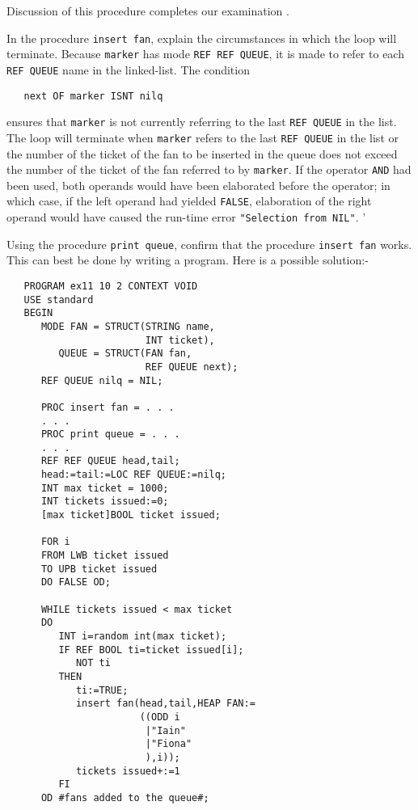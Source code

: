 Discussion of this procedure completes our examination
 .
\begin{exercise}
\item In the procedure \verb|insert fan|, explain the circumstances
in which the loop will terminate. \ans Because \verb|marker| has mode
\verb|REF REF QUEUE|, it is made to refer to each \verb|REF QUEUE|
name in the linked-list. The condition
\begin{verbatim}
   next OF marker ISNT nilq
\end{verbatim}
\noindent
ensures that \verb|marker| is not currently referring to the last
\verb|REF QUEUE| in the list. The loop will terminate when
\verb|marker| refers to the last \verb|REF QUEUE| in the list or the
number of the ticket of the fan to be inserted in the queue does not
exceed the number of the ticket of the fan referred to by
\verb|marker|.
\medskip
If the operator \verb|AND| had been used, both operands would have been
elaborated before the operator; in which case, if the left operand
had yielded \verb|FALSE|, elaboration of the right operand would have
caused the run-time error \verb|"Selection from NIL"|.
'
\item Using the procedure \verb|print queue|, confirm that the
procedure \verb|insert fan| works. \ans This can best be done by
writing a program. Here is a possible solution:-
\begin{verbatim}
   PROGRAM ex11 10 2 CONTEXT VOID
   USE standard
   BEGIN
      MODE FAN = STRUCT(STRING name,
                        INT ticket),
         QUEUE = STRUCT(FAN fan,
                        REF QUEUE next);
      REF QUEUE nilq = NIL;

      PROC insert fan = . . .
      . . .
      PROC print queue = . . .
      . . .
      REF REF QUEUE head,tail;
      head:=tail:=LOC REF QUEUE:=nilq;
      INT max ticket = 1000;
      INT tickets issued:=0;
      [max ticket]BOOL ticket issued;

      FOR i
      FROM LWB ticket issued
      TO UPB ticket issued
      DO FALSE OD;

      WHILE tickets issued < max ticket
      DO
         INT i=random int(max ticket);
         IF REF BOOL ti=ticket issued[i];
            NOT ti
         THEN
            ti:=TRUE;
            insert fan(head,tail,HEAP FAN:=
                       ((ODD i
                        |"Iain"
                        |"Fiona"
                        ),i));
            tickets issued+:=1
         FI
      OD #fans added to the queue#;


\end{verbatim}
\end{exercise}
